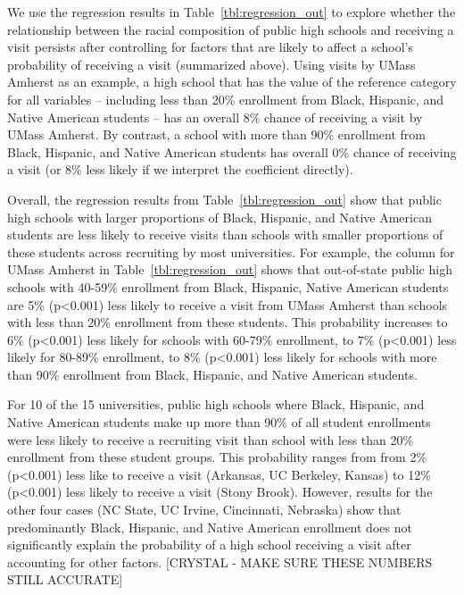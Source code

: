 \documentclass[twoside]{article}
\begin{document}
We use the regression results in Table~\ref{tbl:regression_out} to explore whether the relationship between the racial composition of public high schools and receiving a visit persists after controlling for factors that are likely to affect a school's probability of receiving a visit (summarized above). Using visits by UMass Amherst as an example, a high school that has the value of the reference category for all variables -- including less than 20\% enrollment from Black, Hispanic, and Native American students -- has an overall 8\% chance of receiving a visit by UMass Amherst. By contrast, a school with more than 90\% enrollment from Black, Hispanic, and Native American students has overall 0\% chance of receiving a visit (or 8\% less likely if we interpret the coefficient directly).

Overall, the regression results from Table~\ref{tbl:regression_out} show that public high schools with larger proportions of Black, Hispanic, and Native American students are less likely to receive visits than schools with smaller proportions of these students across recruiting by most universities. For example, the column for UMass Amherst in Table~\ref{tbl:regression_out} shows that out-of-state public high schools with 40-59\% enrollment from Black, Hispanic, Native American students are 5\% (p<0.001) less likely to receive a visit from UMass Amherst than schools with less than 20\% enrollment from these students. This probability increases to 6\% (p<0.001) less likely for schools with 60-79\% enrollment, to 7\% (p<0.001) less likely for 80-89\% enrollment, to 8\% (p<0.001) less likely for schools with more than 90\% enrollment from Black, Hispanic, and Native American students.

For 10 of the 15 universities, public high schools where Black, Hispanic, and Native American students make up more than 90\% of all student enrollments were less likely to receive a recruiting visit than school with less than 20\% enrollment from these student groups. This probability ranges from from 2\% (p<0.001) less like to receive a visit (Arkansas, UC Berkeley, Kansas)  to 12\% (p<0.001) less likely to receive a visit (Stony Brook). However, results for the other four cases (NC State, UC Irvine, Cincinnati, Nebraska) show that predominantly Black, Hispanic, and Native American enrollment does not significantly explain the probability of a high school receiving a visit after accounting for other factors. [CRYSTAL - MAKE SURE THESE NUMBERS STILL ACCURATE]
\end{document}
